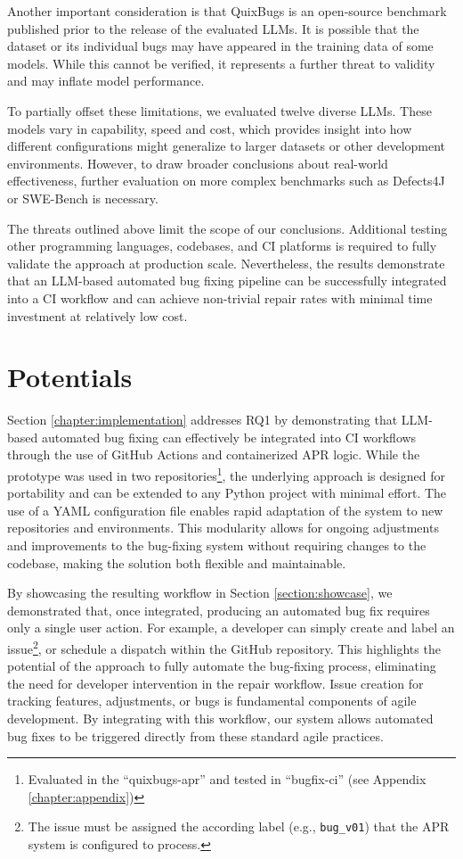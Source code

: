 Another important consideration is that QuixBugs is an open-source benchmark published prior to the release of the evaluated \acp{LLM}. It is possible that the dataset or its individual bugs may have appeared in the training data of some models. While this cannot be verified, it represents a further threat to validity and may inflate model performance.

To partially offset these limitations, we evaluated twelve diverse \acp{LLM}. These models vary in capability, speed and cost, which provides insight into how different configurations might generalize to larger datasets or other development environments. However, to draw broader conclusions about real-world effectiveness, further evaluation on more complex benchmarks such as Defects4J or SWE-Bench is necessary.

The threats outlined above limit the scope of our conclusions. Additional testing other programming languages, codebases, and CI platforms is required to fully validate the approach at production scale. Nevertheless, the results demonstrate that an LLM-based automated bug fixing pipeline can be successfully integrated into a CI workflow and can achieve non-trivial repair rates with minimal time investment at relatively low cost.

\section{Potentials}

Section \ref{chapter:implementation} addresses RQ1 by demonstrating that LLM-based automated bug fixing can effectively be integrated into \ac{CI} workflows through the use of GitHub Actions and containerized APR logic. While the prototype was used in two repositories\footnote{Evaluated in the ``quixbugs-apr'' and tested in ``bugfix-ci'' (see Appendix \ref{chapter:appendix})}, the underlying approach is designed for portability and can be extended to any Python project with minimal effort. The use of a YAML configuration file enables rapid adaptation of the system to new repositories and environments. This modularity allows for ongoing adjustments and improvements to the bug-fixing system without requiring changes to the codebase, making the solution both flexible and maintainable.

By showcasing the resulting workflow in Section \ref{section:showcase}, we demonstrated that, once integrated, producing an automated bug fix requires only a single user action. For example, a developer can simply create and label an issue\footnote{The issue must be assigned the according label (e.g., \texttt{bug\_v01}) that the APR system is configured to process.}, or schedule a dispatch within the GitHub repository. This highlights the potential of the approach to fully automate the bug-fixing process, eliminating the need for developer intervention in the repair workflow. Issue creation for tracking features, adjustments, or bugs is fundamental components of agile development. \cite{abrahamssonAgileSoftwareDevelopment2017} By integrating with this workflow, our system allows automated bug fixes to be triggered directly from these standard agile practices.


